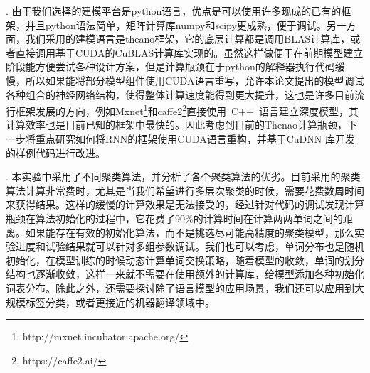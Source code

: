 . 由于我们选择的建模平台是python语言，优点是可以使用许多现成的已有的框架，并且python语法简单，矩阵计算库numpy和scipy更成熟，便于调试。另一方面，我们采用的建模语言是theano框架，它的底层计算都是调用BLAS计算库，或者直接调用基于CUDA的CuBLAS计算库实现的。虽然这样做便于在前期模型建立阶段能方便尝试各种设计方案，但是计算瓶颈在于python的解释器执行代码缓慢，所以如果能将部分模型组件使用CUDA语言重写，允许本论文提出的模型调试各种组合的神经网络结构，使得整体计算速度能得到更大提升，这也是许多目前流行框架发展的方向，例如Mxnet\footnote{http://mxnet.incubator.apache.org/}和caffe2\footnote{https://caffe2.ai/}直接使用~C++~语言建立深度模型，其计算效率也是目前已知的框架中最快的。因此考虑到目前的Thenao计算瓶颈，下一步将重点研究如何将RNN的框架使用CUDA语言重构，并基于CuDNN 库开发的样例代码进行改进。


. 本实验中采用了不同聚类算法，并分析了各个聚类算法的优劣。目前采用的聚类算法计算非常费时，尤其是当我们希望进行多层次聚类的时候，需要花费数周时间来获得结果。这样的缓慢的计算效果是无法接受的，经过针对代码的调试发现计算瓶颈在算法初始化的过程中，它花费了90\%的计算时间在计算两两单词之间的距离。如果能存在有效的初始化算法，而不是挑选尽可能高精度的聚类模型，那么实验进度和试验结果就可以针对多组参数调试。我们也可以考虑，单词分布也是随机初始化，在模型训练的时候动态计算单词交换策略，随着模型的收敛，单词的划分结构也逐渐收敛，这样一来就不需要在使用额外的计算库，给模型添加各种初始化词表分布。除此之外，还需要探讨除了语言模型的应用场景，我们还可以应用到大规模标签分类，或者更接近的机器翻译领域中。

